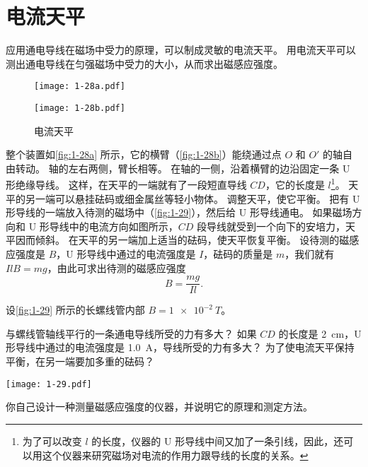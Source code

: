 \section{电流天平}
应用通电导线在磁场中受力的原理，可以制成灵敏的电流天平。
用电流天平可以测出通电导线在匀强磁场中受力的大小，从而求出磁感应强度。
\begin{figure}
  \begin{minipage}[b]{0.48\linewidth}\centering
    \texttt{[image: 1-28a.pdf]}
    \subcaption{}\label{fig:1-28a}
  \end{minipage}
  \begin{minipage}[b]{0.48\linewidth}\centering
    \texttt{[image: 1-28b.pdf]}
    \subcaption{}\label{fig:1-28b}
  \end{minipage}
  \caption{电流天平}\label{fig:1-28}
\end{figure}

整个装置如\cref{fig:1-28a} 所示，它的横臂（\cref{fig:1-28b}）能绕通过点 $O$ 和 $O'$ 的轴自由转动。
轴的左右两侧，臂长相等。
在轴的一侧，沿着横臂的边沿固定一条 U 形绝缘导线。
这样，在天平的一端就有了一段短直导线 $CD$，它的长度是 $l$\footnote{为了可以改变 $l$ 的长度，仪器的 U 形导线中间又加了一条引线，因此，还可以用这个仪器来研究磁场对电流的作用力跟导线的长度的关系。}。
天平的另一端可以悬挂砝码或细金属丝等轻小物体。
调整天平，使它平衡。
把有 U 形导线的一端放入待测的磁场中（\cref{fig:1-29}），然后给 U 形导线通电。
如果磁场方向和 U 形导线中的电流方向如图所示，$CD$ 段导线就受到一个向下的安培力，天平因而倾斜。
在天平的另一端加上适当的砝码，使天平恢复平衡。
设待测的磁感应强度是 $B$，U 形导线中通过的电流强度是 $I$，砝码的质量是 $m$，我们就有 $Il B=mg$，由此可求出待测的磁感应强度
\[B=\frac{mg}{Il}.\]

\begin{Practice}
\begin{question}
  \item 设\cref{fig:1-29} 所示的长螺线管内部 $B=\qty{1e-2}{T}$。
  \begin{tasks}
    \task 与螺线管轴线平行的一条通电导线所受的力有多大？
    \task 如果 $CD$ 的长度是 \qty{2}{cm}，U 形导线中通过的电流强度是 \qty{1.0}{A}，导线所受的力有多大？
    \task 为了使电流天平保持平衡，在另一端要加多重的砝码？
  \end{tasks}
  \begin{figurehere}
    \begin{minipage}{\linewidth}\centering
    \texttt{[image: 1-29.pdf]}
    \caption{测定螺线管的磁感应强度}\label{fig:1-29}
    \end{minipage}
  \end{figurehere}
  \item 你自己设计一种测量磁感应强度的仪器，并说明它的原理和测定方法。
\end{question}
\end{Practice}


